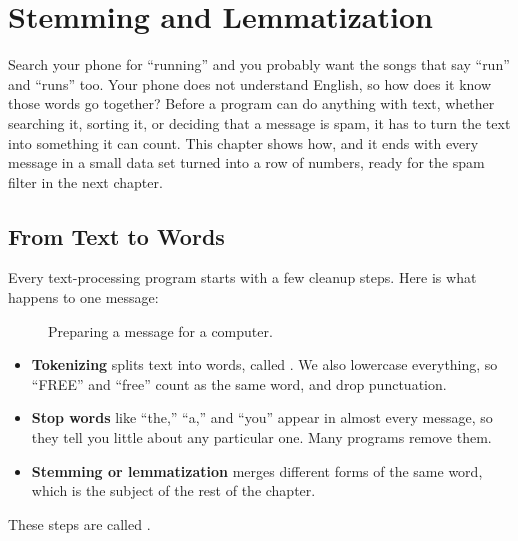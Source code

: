 \chapter{Stemming and Lemmatization}

Search your phone for ``running'' and you probably want the songs that say ``run'' and ``runs'' too. Your phone
does not understand English, so how does it know those words go together? Before a program can do anything
with text, whether searching it, sorting it, or deciding that a message is spam, it has to turn the text into
something it can count. This chapter shows how, and it ends with every message in a small data set turned into
a row of numbers, ready for the spam filter in the next chapter.

\section{From Text to Words}
Every text-processing program starts with a few cleanup steps. Here is what happens to one message:

\begin{figure}[H]
\centering
{}
\caption{Preparing a message for a computer.}
\label{fig:text-pipeline}
\end{figure}

\begin{itemize}
\item \textbf{Tokenizing} splits text into words, called . We also lowercase
everything, so ``FREE'' and ``free'' count as the same word, and drop punctuation.
\item \textbf{Stop words} like ``the,'' ``a,'' and ``you'' appear in almost every message,
so they tell you little about any particular one. Many programs remove them.
\item \textbf{Stemming or lemmatization} merges different forms of the same word, which is the subject of the
rest of the chapter.
\end{itemize}
These steps are called .

